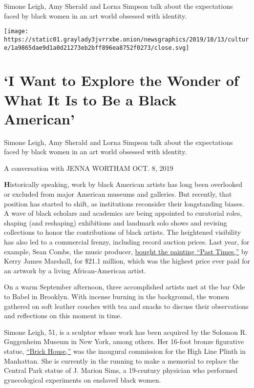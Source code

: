 Simone Leigh, Amy Sherald and Lorna Simpson talk about the expectations
faced by black women in an art world obsessed with identity.

\texttt{[image: https://static01.graylady3jvrrxbe.onion/newsgraphics/2019/10/13/culture/1a9865dae9d1a0d21273eb2bff896ea8752f0273/close.svg]}

\hypertarget{i-want-to-explore-the-wonder-of-what-it-is-to-be-a-black-american-1}{%
\section{`I Want to Explore the Wonder of What It Is to Be a Black
American'}\label{i-want-to-explore-the-wonder-of-what-it-is-to-be-a-black-american-1}}

Simone Leigh, Amy Sherald and Lorna Simpson talk about the expectations
faced by black women in an art world obsessed with identity.

A conversation with JENNA WORTHAM OCT. 8, 2019

\textbf{H}istorically speaking, work by black American artists has long
been overlooked or excluded from major American museums and galleries.
But recently, that position has started to shift, as institutions
reconsider their longstanding biases. A wave of black scholars and
academics are being appointed to curatorial roles, shaping (and
reshaping) exhibitions and landmark solo shows and revising collections
to honor the contributions of black artists. The heightened visibility
has also led to a commercial frenzy, including record auction prices.
Last year, for example, Sean Combs, the music producer,
\href{https://www.nytimes3xbfgragh.onion/2018/05/18/arts/sean-combs-kerry-james-marshall.html}{bought
the painting ``Past Times,''} by Kerry James Marshall, for \$21.1
million, which was the highest price ever paid for an artwork by a
living African-American artist.

On a warm September afternoon, three accomplished artists met at the bar
Ode to Babel in Brooklyn. With incense burning in the background, the
women gathered on soft leather couches with tea and snacks to discuss
their observations and reflections on this moment in time.

Simone Leigh, 51, is a sculptor whose work has been acquired by the
Solomon R. Guggenheim Museum in New York, among others. Her 16-foot
bronze figurative statue,
\href{https://www.nytimes3xbfgragh.onion/2019/04/04/arts/design/high-line-simone-leigh-brick-house.html}{``Brick
House,''} was the inaugural commission for the High Line Plinth in
Manhattan. She is currently in the running to make a memorial to replace
the Central Park statue of J. Marion Sims, a 19-century physician who
performed gynecological experiments on enslaved black women.

